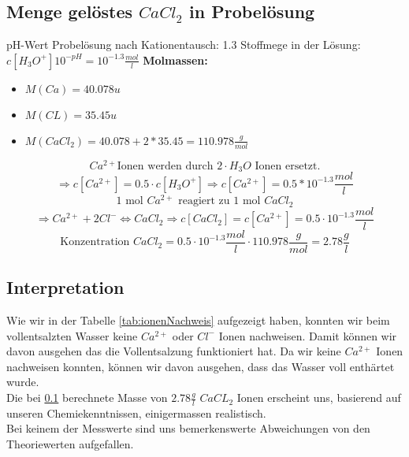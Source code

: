 \documentclass[10pt,oneside,a4paper,fleqn]{article}
\begin{document}
\subsection{Menge gelöstes $CaCl_2$ in Probelösung}
\label{mengecacl}
pH-Wert Probelösung nach Kationentausch: 1.3 \newline
Stoffmege in der Lösung:
$c\left[H_3O^+\right]10^{-pH}=10^{-1.3}\frac{mol}{l}$\newline
\textbf{Molmassen:}
\begin{itemize}
	\item $M\left( Ca \right)=40.078 u$
	\item $M\left( CL \right)=35.45 u$
	\item $M\left(CaCl_2\right)= 40.078+2*35.45=110.978\frac{g}{mol}$
\end{itemize}

$$Ca^{2+} \textrm{Ionen werden durch } 2 \cdot H_3O \textrm{ Ionen
ersetzt.}$$
$$\Rightarrow c\left[Ca^{2+}\right] = 0.5 \cdot c\left[H_3O^+\right] \Rightarrow
c\left[Ca^{2+}\right] = 0.5 * 10^{-1.3}\frac{mol}{l}$$
$$1\textrm{ mol }Ca^{2+} \textrm{ reagiert zu } 1\textrm{ mol }CaCl_2$$
$$\Rightarrow Ca^{2+}+ 2Cl^- \Leftrightarrow CaCl_2 \Rightarrow
c\left[CaCl_2\right]= c\left[Ca^{2+}\right] = 0.5 \cdot 10^{-1.3}\frac{mol}{l}$$
$$\textrm{Konzentration } CaCl_2=0.5 \cdot
10^{-1.3}\frac{mol}{l}\cdot 110.978 \frac{g}{mol}= 2.78 \frac{g}{l}$$

\subsection{Interpretation}
Wie wir in der Tabelle \ref{tab:ionenNachweis} aufgezeigt haben, konnten wir
beim vollentsalzten Wasser keine $Ca^{2+}$ oder $Cl^-$ Ionen nachweisen. Damit
können wir davon ausgehen das die Vollentsalzung funktioniert hat. Da wir keine
$Ca^{2+}$ Ionen nachweisen konnten, können wir davon ausgehen, dass das Wasser
voll enthärtet wurde.\\
Die bei \ref{mengecacl} berechnete Masse von $2.78\frac{g}{l}$ $CaCL_2$ Ionen
erscheint uns, basierend auf unseren Chemiekenntnissen, einigermassen
realistisch.\\
Bei keinem der Messwerte sind uns bemerkenswerte Abweichungen von den
Theoriewerten aufgefallen.
\end{document}
